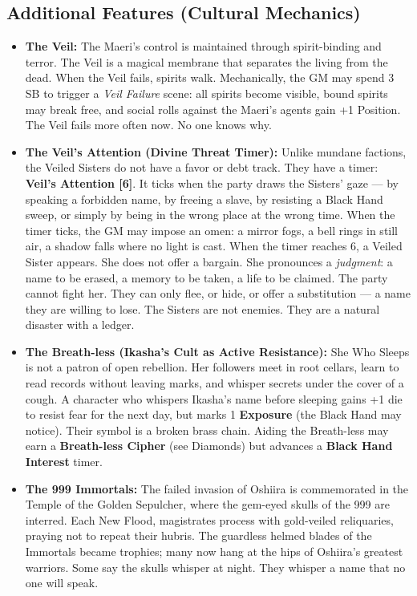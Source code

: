 \subsection*{Additional Features (Cultural Mechanics)}
\label{sec:ashaan-mechanics}

\begin{itemize}
\item \textbf{The Veil:} The Maeri's control is maintained through spirit-binding and terror. The Veil is a magical membrane that separates the living from the dead. When the Veil fails, spirits walk. Mechanically, the GM may spend 3 SB to trigger a \emph{Veil Failure} scene: all spirits become visible, bound spirits may break free, and social rolls against the Maeri's agents gain +1 Position. The Veil fails more often now. No one knows why.

\item \textbf{The Veil's Attention (Divine Threat Timer):} Unlike mundane factions, the Veiled Sisters do not have a favor or debt track. They have a timer: \textbf{Veil's Attention [6]}. It ticks when the party draws the Sisters' gaze --- by speaking a forbidden name, by freeing a slave, by resisting a Black Hand sweep, or simply by being in the wrong place at the wrong time. When the timer ticks, the GM may impose an omen: a mirror fogs, a bell rings in still air, a shadow falls where no light is cast. When the timer reaches 6, a Veiled Sister appears. She does not offer a bargain. She pronounces a \emph{judgment}: a name to be erased, a memory to be taken, a life to be claimed. The party cannot fight her. They can only flee, or hide, or offer a substitution --- a name they are willing to lose. The Sisters are not enemies. They are a natural disaster with a ledger.

\item \textbf{The Breath-less (Ikasha's Cult as Active Resistance):} She Who Sleeps is not a patron of open rebellion. Her followers meet in root cellars, learn to read records without leaving marks, and whisper secrets under the cover of a cough. A character who whispers Ikasha's name before sleeping gains +1 die to resist fear for the next day, but marks 1 \textbf{Exposure} (the Black Hand may notice). Their symbol is a broken brass chain. Aiding the Breath-less may earn a \textbf{Breath-less Cipher} (see Diamonds) but advances a \textbf{Black Hand Interest} timer.

\item \textbf{The 999 Immortals:} The failed invasion of Oshiira is commemorated in the Temple of the Golden Sepulcher, where the gem-eyed skulls of the 999 are interred. Each New Flood, magistrates process with gold-veiled reliquaries, praying not to repeat their hubris. The guardless helmed blades of the Immortals became trophies; many now hang at the hips of Oshiira's greatest warriors. Some say the skulls whisper at night. They whisper a name that no one will speak.


\end{itemize}
